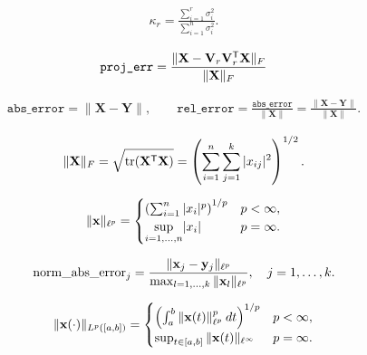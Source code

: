\documentclass[12 pt]{article}
\begin{document}

\begin{align*}
    \kappa_r
    = \frac{\sum_{i=1}^{r}\sigma_i^2}{\sum_{i=1}^{n}\sigma_i^2}.
\end{align*}

\begin{align*}
    \texttt{proj\_err}
    = \frac{\|\mathbf{X} - \mathbf{V}_r\mathbf{V}_r^{\mathsf T}\mathbf{X}\|_F}{\|\mathbf{X}\|_F}
\end{align*}

\begin{align*}
    \texttt{abs\_error}
    = \|\mathbf{X} - \mathbf{Y}\|,
    \qquad
    \texttt{rel\_error}
    = \frac{\texttt{abs\_error}}{\|\mathbf{X}\|}
    = \frac{\|\mathbf{X} - \mathbf{Y}\|}{\|\mathbf{X}\|}.
\end{align*}

\begin{align*}
    \|\mathbf{X}\|_{F}
    = \sqrt{\textrm{tr}(\mathbf{X}^{\mathsf T}\mathbf{X})}
    = \left(\sum_{i=1}^{n}\sum_{j=1}^{k}|x_{ij}|^2\right)^{1/2}.
\end{align*}

\begin{align*}
    \|\mathbf{x}\|_{\ell^p}
    = \begin{cases}
    \left(\sum_{i=1}^{n}|x_i|^p\right)^{1/p} & p < \infty,
    \\
    \underset{i=1,\ldots,n}{\textrm{sup}}|x_i| & p = \infty.
    \end{cases}
\end{align*}

\begin{align*}
    \textrm{norm\_abs\_error}_j
    = \frac{\|\mathbf{x}_j - \mathbf{y}_j\|_{\ell^p}}{\max_{l=1,\ldots,k}\|\mathbf{x}_l\|_{\ell^p}},
    \quad
    j = 1,\ldots,k.
\end{align*}

\begin{align*}
    \|\mathbf{x}(\cdot)\|_{L^p([a,b])}
    = \begin{cases}
    \left(\int_{a}^{b}\|\mathbf{x}(t)\|_{\ell^p}^p\:dt\right)^{1/p} & p < \infty,
    \\
    \sup_{t\in[a,b]}\|\mathbf{x}(t)\|_{\ell^\infty} & p = \infty.
    \end{cases}
\end{align*}
\end{document}
